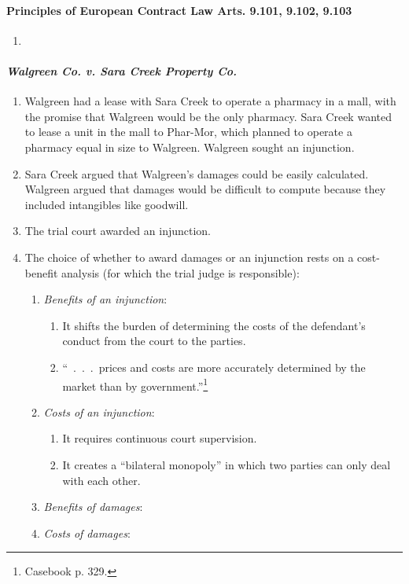 \paragraph{Principles of European Contract Law Arts. 9.101, 9.102, 9.103}

\begin{enumerate}
    \item %
\end{enumerate}

\paragraph{\emph{Walgreen Co. v. Sara Creek Property Co.}}

\begin{enumerate}
    \item Walgreen had a lease with Sara Creek to operate a pharmacy in a 
    mall, with the promise that Walgreen would be the only pharmacy. Sara 
    Creek wanted to lease a unit in the mall to Phar-Mor, which planned to 
    operate a pharmacy equal in size to Walgreen. Walgreen sought an 
    injunction.
    \item Sara Creek argued that Walgreen's damages could be easily 
    calculated. Walgreen argued that damages would be difficult to compute 
    because they included intangibles like goodwill.
    \item The trial court awarded an injunction.
    \item The choice of whether to award damages or an injunction rests on a 
    cost-benefit analysis (for which the trial judge is responsible):
    \begin{enumerate}
        \item \emph{Benefits of an injunction}:
        \begin{enumerate}
            \item It shifts the burden of determining the costs of the 
            defendant's conduct from the court to the parties.
            \item ``~.~.~.~prices and costs are more accurately determined by 
            the market than by government.''\footnote{Casebook p. 329.}
        \end{enumerate}
        \item \emph{Costs of an injunction}:
        \begin{enumerate}
            \item It requires continuous court supervision.
            \item It creates a ``bilateral monopoly'' in which two parties can 
            only deal with each other. %
        \end{enumerate}
        \item \emph{Benefits of damages}:
        \item \emph{Costs of damages}:
    \end{enumerate}
\end{enumerate}

